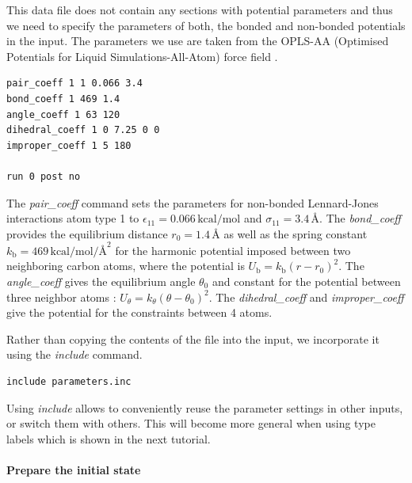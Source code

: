 \documentclass[9pt,tutorial]{livecoms}
\begin{document}
This data file does not contain any sections with potential parameters
and thus we need to specify the parameters of both, the bonded and
non-bonded potentials in the input.  The parameters we use are taken
from the OPLS-AA (Optimised Potentials for Liquid Simulations-All-Atom)
force field \cite{jorgensenDevelopmentTestingOPLS1996}.
\begin{lstlisting}
pair_coeff 1 1 0.066 3.4
bond_coeff 1 469 1.4
angle_coeff 1 63 120
dihedral_coeff 1 0 7.25 0 0
improper_coeff 1 5 180

run 0 post no
\end{lstlisting}
The \textit{pair\_coeff} command sets the parameters for non-bonded
Lennard-Jones interactions atom type 1 to
$\epsilon_{11} = 0.066 \, \text{kcal/mol}$ and
$\sigma_{11} = 3.4 \, \text{\AA{}}$.  The \textit{bond\_coeff} provides
the equilibrium distance $r_0= 1.4 \, \text{\AA{}}$ as well as the
spring constant $k_\text{b} = 469 \, \text{kcal/mol/\AA{}}^2$ for the
harmonic potential imposed between two neighboring carbon atoms, where
the potential is $U_\text{b} = k_\text{b} ( r - r_0)^2$. The
\textit{angle\_coeff} gives the equilibrium angle $\theta_0$ and
constant for the potential between three neighbor atoms :
$U_\theta = k_\theta ( \theta - \theta_0)^2$. The
\textit{dihedral\_coeff} and \textit{improper\_coeff} give the potential
for the constraints between 4 atoms.

Rather than copying the contents of the file into the input, we
incorporate it using the \textit{include} command.
\begin{lstlisting}
include parameters.inc
\end{lstlisting}
Using \textit{include} allows to conveniently reuse the parameter settings
in other inputs, or switch them with others. This will become more general
when using type labels \cite{typelabel_paper} which is shown in the next
tutorial.

\paragraph{Prepare the initial state}
\end{document}
